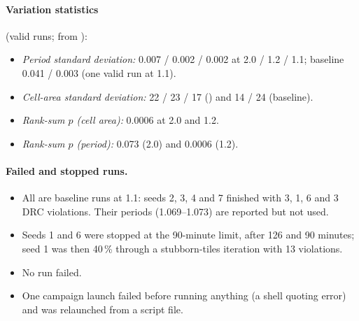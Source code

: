 \paragraph{Variation statistics} (valid runs; from ):
\begin{itemize}
  \item \emph{Period standard deviation:} \PAMS{} 0.007 / 0.002 / 0.002\ns{} at 2.0 / 1.2 / 1.1\ns{}; baseline 0.041 / 0.003\ns{} (one valid run at 1.1).
  \item \emph{Cell-area standard deviation:} 22 / 23 / 17\um{} (\PAMS{}) and 14 / 24\um{} (baseline).
  \item \emph{Rank-sum $p$ (cell area):} 0.0006 at 2.0 and 1.2\ns{}.
  \item \emph{Rank-sum $p$ (period):} 0.073 (2.0\ns) and 0.0006 (1.2\ns).
\end{itemize}

\paragraph{Failed and stopped runs.}
\begin{itemize}
  \item All are baseline runs at 1.1\ns: seeds 2, 3, 4 and 7 finished with 3, 1, 6 and 3 DRC violations. Their periods (1.069--1.073\ns) are reported but not used.
  \item Seeds 1 and 6 were stopped at the 90-minute limit, after 126 and 90 minutes; seed 1 was then 40\,\% through a stubborn-tiles iteration with 13 violations.
  \item No \PAMS{} run failed.
  \item One campaign launch failed before running anything (a shell quoting error) and was relaunched from a script file.
\end{itemize}

